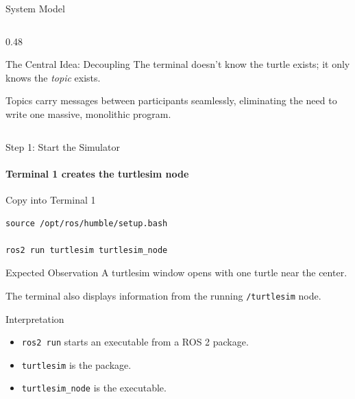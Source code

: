 \begin{frame}[fragile]{System Model}
\begin{columns}[T,onlytextwidth]
    \begin{column}{0.48\textwidth}
        \begin{alertblock}{The Central Idea: Decoupling}
            The terminal doesn't know the turtle exists; it only knows the \textit{topic} exists. 
            
            \vspace{0.15cm}
            Topics carry messages between participants seamlessly, eliminating the need to write one massive, monolithic program.
        \end{alertblock}
    \end{column}

\end{columns}

\end{frame}

\begin{frame}[fragile]{Step 1: Start the Simulator}
\framesubtitle{Terminal 1 creates the turtlesim node}

\footnotesize

\begin{block}{Copy into Terminal 1}
\begin{verbatim}
source /opt/ros/humble/setup.bash

ros2 run turtlesim turtlesim_node
\end{verbatim}
\end{block}

\begin{exampleblock}{Expected Observation}
A turtlesim window opens with one turtle near the center.

The terminal also displays information from the running
\texttt{/turtlesim} node.
\end{exampleblock}

\begin{block}{Interpretation}
\begin{itemize}
    \setlength{\itemsep}{0.18em}
    \item \texttt{ros2 run} starts an executable from a ROS 2 package.
    \item \texttt{turtlesim} is the package.
    \item \texttt{turtlesim\_node} is the executable.
\end{itemize}
\end{block}


\end{frame}

